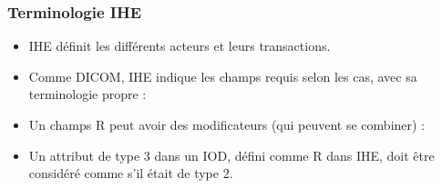\frame
 {
 	\frametitle{Terminologie IHE}
	
	\begin{itemize}
		\item IHE d\'efinit les diff\'erents acteurs et leurs transactions.
		\item<2-> Comme DICOM, IHE indique les champs requis selon les cas, avec sa terminologie propre :	
		\item<5-> Un champs R peut avoir des modificateurs (qui peuvent se combiner) :
		\item<8-> Un attribut de type 3 dans un IOD, d\'efini comme R dans IHE, doit \^etre consid\'er\'e comme s'il \'etait de type 2.
	\end{itemize}
	
 }
